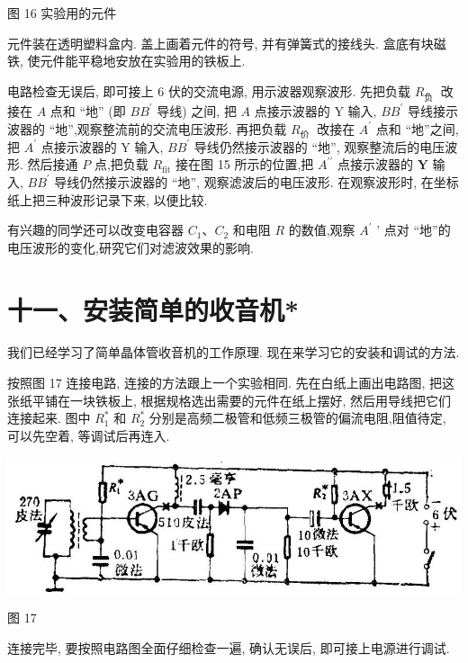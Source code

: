\documentclass[10pt]{article}
\begin{document}
图 16 实验用的元件

元件装在透明塑料盒内. 盖上画着元件的符号, 并有弹簧式的接线头. 盒底有块磁铁, 使元件能平稳地安放在实验用的铁板上.

电路检查无误后, 即可接上 6 伏的交流电源, 用示波器观察波形. 先把负载 \({R}_{\text{负 }}\) 改接在 \(A\) 点和 “地” (即 \(B{B}^{\prime }\) 导线) 之间, 把 \(A\) 点接示波器的 \(\mathrm{Y}\) 输入, \(B{B}^{\prime }\) 导线接示波器的 “地”,观察整流前的交流电压波形. 再把负载 \({R}_{\text{价 }}\) 改接在 \({A}^{\prime }\) 点和 “地”之间, 把 \({A}^{\prime }\) 点接示波器的 \(\mathrm{Y}\) 输入, \(B{B}^{\prime }\) 导线仍然接示波器的 “地”, 观察整流后的电压波形. 然后接通 \(P\) 点,把负载 \({R}_{\mathrm{{fit}}}\) 接在图 15 所示的位置,把 \({A}^{\prime \prime }\) 点接示波器的 \(\mathbf{Y}\) 输入, \(B{B}^{\prime }\) 导线仍然接示波器的 “地”, 观察滤波后的电压波形. 在观察波形时, 在坐标纸上把三种波形记录下来, 以便比较.

有兴趣的同学还可以改变电容器 \({C}_{1}\text{、}{C}_{2}\) 和电阻 \(R\) 的数值,观察 \({A}^{\prime }\) ’ 点对 “地”的电压波形的变化,研究它们对滤波效果的影响.

\section*{十一、安装简单的收音机*}

我们已经学习了简单晶体管收音机的工作原理. 现在来学习它的安装和调试的方法.

按照图 17 连接电路, 连接的方法跟上一个实验相同. 先在白纸上画出电路图, 把这张纸平铺在一块铁板上, 根据规格选出需要的元件在纸上摆好, 然后用导线把它们连接起来. 图中 \({R}_{1}^{ * }\) 和 \({R}_{2}^{ * }\) 分别是高频二极管和低频三极管的偏流电阻,阻值待定, 可以先空着, 等调试后再连入.

\begin{center}
\includegraphics[max width=1.0\textwidth]{images/01913056-1f15-74d8-9184-9aab52c9d66b_390_552072.jpg}
\end{center}

图 17

连接完毕, 要按照电路图全面仔细检查一遍, 确认无误后, 即可接上电源进行调试.
\end{document}
